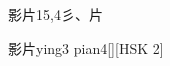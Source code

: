 \begin{entry}{影片}{15,4}{⼺、⽚}
  \begin{phonetics}{影片}{ying3 pian4}[][HSK 2]
  \end{phonetics}
\end{entry}
